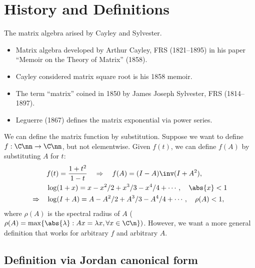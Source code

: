 \documentclass{article}
\begin{document}
\maketitle
\tableofcontents

\section{History and Definitions}

The matrix algebra arised by Cayley and Sylvester.
\begin{itemize}
    \item Matrix algebra developed by Arthur Cayley, FRS (1821--1895) in
    his paper ``Memoir on the Theory of Matrix'' (1858).
    \item Cayley considered matrix square root is his 1858 memoir.
    \item The term ``matrix'' coined in 1850 by James Joseph Sylvester,
    FRS (1814--1897).
    \item Leguerre (1867) defines the matrix exponential via power
    series.
\end{itemize}

We can define the matrix function by substitution. Suppose we want to
define $f:\C\nn \to \C\nn$,  but not elementwise. Given $f(t)$, we can
define $f(A)$ by substituting $A$ for $t$:
\begin{equation}\notag
    \begin{aligned}
        & f(t) = \frac{1+t^2}{1-t} \quad \Rightarrow \quad f(A) = (I-A)\inv (I+A^2), \\
        & \log(1 + x) = x - x^2/2 + x^3/3 - x^4/4 + \cdots, \quad \abs{x} < 1 \\
        \Rightarrow \quad & \log(I + A) = A - A^2/2 + A^3/3 - A^4/4 + \cdots, \quad \rho(A) < 1,
    \end{aligned}
\end{equation}
where $\rho(A)$ is the spectral radius of $A$ ($\rho(A) = \max
\{\abs{\lambda} : Ax = \lambda x, \forall x \in \C\n \})$. However, we
want a more general definition that works for arbitrary $f$ and
arbitrary $A$.

\subsection{Definition via Jordan canonical form}
\end{document}
